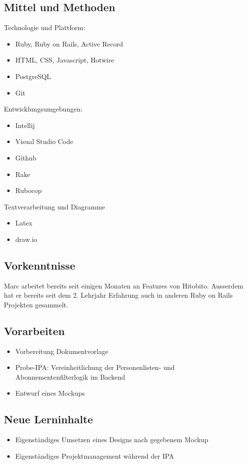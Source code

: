 \subsection{Mittel und Methoden}
Technologie und Plattform:

\begin{itemize}
    \item Ruby, Ruby on Rails, Active Record
    \item HTML, CSS, Javascript, Hotwire
    \item PostgreSQL
    \item Git
\end{itemize}

Entwicklungsumgebungen:

\begin{itemize}
    \item Intellij
    \item Visual Studio Code
    \item Github
    \item Rake
    \item Rubocop
\end{itemize}

Textverarbeitung und Diagramme

\begin{itemize}
    \item Latex
    \item draw.io
\end{itemize}

\subsection{Vorkenntnisse}
Marc arbeitet bereits seit einigen Monaten an Features von Hitobito. Ausserdem hat er bereits seit dem 2. Lehrjahr Erfahrung auch in anderen Ruby on Rails Projekten gesammelt.

\subsection{Vorarbeiten}
\begin{itemize}
    \item Vorbereitung Dokumentvorlage
    \item Probe-IPA: Vereinheitlichung der Personenlisten- und Abonnementenfilterlogik im Backend
    \item Entwurf eines Mockups
\end{itemize}

\subsection{Neue Lerninhalte}
\begin{itemize}
    \item Eigenständiges Umsetzen eines Designs nach gegebenem Mockup
    \item Eigenständiges Projektmanagement während der IPA
\end{itemize}

